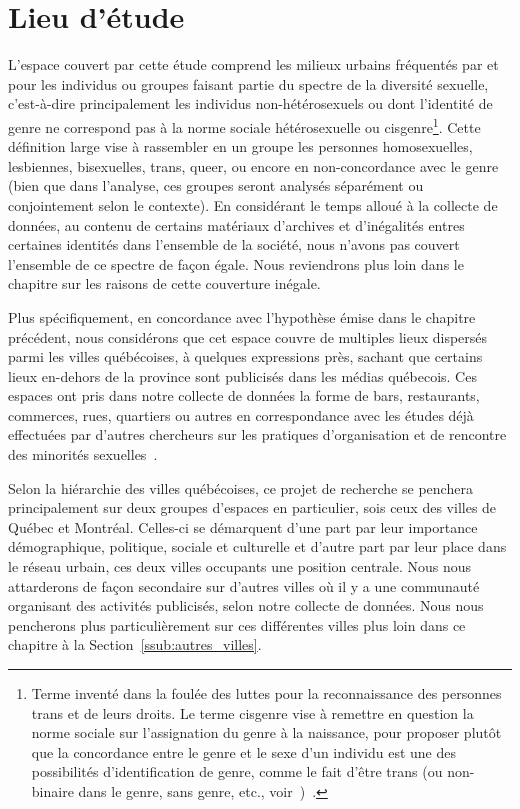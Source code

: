 \section{Lieu d'étude}
\label{sec:lieu_d_tude}
L'espace couvert par cette étude comprend les milieux urbains fréquentés par et pour les individus ou groupes faisant partie du spectre de la diversité sexuelle, c'est-à-dire principalement les individus non-hétérosexuels ou dont l'identité de genre ne correspond pas à la norme sociale hétérosexuelle ou cisgenre\footnote{Terme inventé dans la foulée des luttes pour la reconnaissance des personnes trans et de leurs droits. 
Le terme cisgenre vise à remettre en  question la norme sociale sur l'assignation du genre à la naissance, pour  proposer plutôt que la concordance entre le genre et le sexe d'un individu est  une des possibilités d'identification de genre, comme le fait d'être trans (ou  non-binaire dans le genre, sans genre, etc., voir~\cite{Barker2015})~\citep[150]{McGeeney2015}.}. 
Cette définition large vise à rassembler en un groupe les personnes homosexuelles, lesbiennes, bisexuelles, trans, queer, ou encore en non-concordance avec le genre (bien que dans l'analyse, ces groupes seront analysés séparément ou conjointement selon le contexte). 
En considérant le temps alloué à la collecte de données, au contenu de certains matériaux d'archives et d'inégalités entres certaines identités dans l'ensemble de la société, nous n'avons pas couvert l'ensemble de ce spectre de façon égale. 
Nous reviendrons plus loin dans le chapitre sur les raisons de cette couverture inégale.

Plus spécifiquement, en concordance avec l'hypothèse émise dans le chapitre précédent, nous considérons que cet espace couvre de multiples lieux dispersés parmi les villes québécoises, à quelques expressions près, sachant que certains lieux en-dehors de la province sont publicisés dans les médias québecois. 
Ces espaces ont pris dans notre collecte de données la forme de bars, restaurants, commerces, rues, quartiers ou autres en correspondance avec les études déjà effectuées par d'autres chercheurs sur les pratiques d'organisation et de rencontre des minorités sexuelles~\citep{Higgins1999,Hinrichs2012}.

Selon la hiérarchie des villes québécoises, ce projet de recherche se penchera principalement sur deux groupes d'espaces en particulier, sois ceux des villes de Québec et Montréal. 
Celles-ci se démarquent d'une part par leur importance démographique, politique, sociale et culturelle et d'autre part par leur place dans le réseau urbain, ces deux villes occupants une position centrale. 
Nous nous attarderons de façon secondaire sur d'autres villes où il y a une communauté \lgbt{} organisant des activités publicisés, selon notre collecte de données. 
Nous nous pencherons plus particulièrement sur ces différentes villes plus loin dans ce chapitre à la Section~\ref{ssub:autres_villes}.

